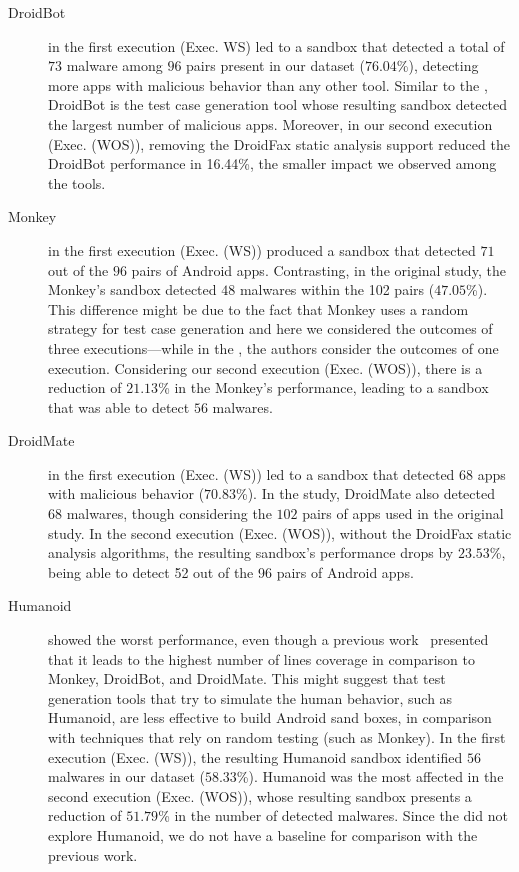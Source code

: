 \begin{description}
\item[DroidBot] in the first execution (Exec. WS) led to a sandbox that detected a total of $73$ malware among $96$ pairs present in our dataset ($76.04$\%),
  detecting more apps with malicious behavior than any other tool. Similar to the \blls, DroidBot is the test case generation tool
  whose resulting sandbox detected the largest number of malicious apps. Moreover, in our second execution (Exec. (WOS)), removing the DroidFax
  static analysis support reduced the DroidBot performance in 16.44\%, the smaller impact we observed among the tools.

  \item[Monkey] in the first execution (Exec. (WS)) produced a sandbox that detected $71$ out of the $96$ pairs of Android apps.
    Contrasting, in the original study, the Monkey's sandbox detected $48$ malwares within the 102 pairs ($47.05$\%). This difference
    might be due to the fact that Monkey uses a random strategy for test case generation and here we considered the outcomes
    of three executions---while in the \blls, the authors consider the outcomes of one execution. 
    Considering our second execution (Exec. (WOS)), there is a reduction of $21.13$\% in the Monkey's performance, leading to
    a sandbox that was able to detect $56$ malwares. 

  \item[DroidMate] in the first execution (Exec. (WS)) led to a sandbox that detected 68 apps with malicious behavior ($70.83$\%).
    In the \blls study, DroidMate also detected $68$ malwares, though considering the $102$ pairs of apps used in the
    original study. In the second execution (Exec. (WOS)),
    without the DroidFax static analysis algorithms, the resulting sandbox's performance drops by $23.53$\%, being able to detect
    52 out of the 96 pairs of Android apps.
    
  \item[Humanoid] showed the worst performance, even though a previous work~\cite{DBLP:conf/kbse/LiY0C19} presented that it leads to
    the highest number of lines coverage in comparison to Monkey, DroidBot, and DroidMate. This might suggest that test generation
    tools that try to simulate the human behavior, such as Humanoid, are less effective to build Android sand boxes, in comparison
    with techniques that rely on random testing (such as Monkey). In the first execution (Exec. (WS)),
    the resulting Humanoid sandbox identified $56$ malwares in our dataset ($58.33$\%). Humanoid was the most affected in the second
    execution (Exec. (WOS)), whose resulting sandbox presents a reduction of $51.79$\%  in the number of detected malwares.
    Since the \blls did not explore Humanoid,
    we do not have a baseline for comparison with the previous work.


\end{description}
